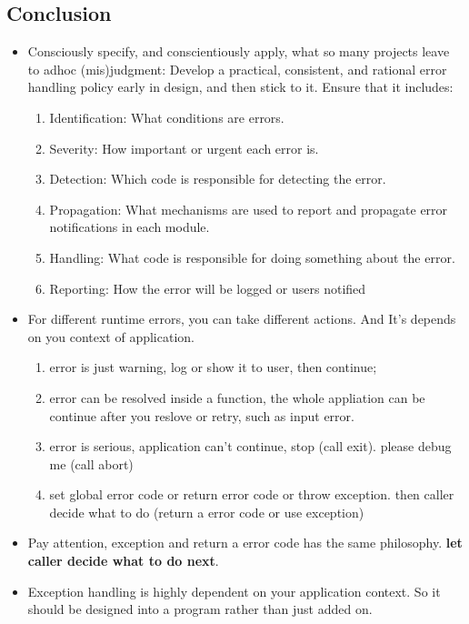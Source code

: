\documentclass[a4paper,12pt,twoside]{book}
\begin{document}
\subsection{Conclusion}
\begin{itemize}


\item  Consciously specify, and conscientiously apply, what so many projects leave to adhoc
(mis)judgment: Develop a practical, consistent, and rational error handling
policy early in design, and then stick to it. Ensure that it includes:

\begin{enumerate}
\item Identification: What conditions are errors.
\item Severity: How important or urgent each error is.
\item Detection: Which code is responsible for detecting the error.
\item Propagation: What mechanisms are used to report and propagate error
notifications in each module.
\item Handling: What code is responsible for doing something about the error.
\item Reporting: How the error will be logged or users notified
\end{enumerate}


\item For different runtime errors, you can take different actions. And It's depends on you context of application.
\begin{enumerate}
\item error is just warning, log or show it to user, then continue;
\item error can be resolved inside a function, the whole appliation can be continue after you reslove or retry, such as input error.
\item error is serious, application can't continue, stop (call exit).  please debug me (call abort)
\item set global error code or return error code or throw exception. then caller decide what to do (return a error code or use exception)
\end{enumerate}

\item Pay attention, exception and return a error code has the same philosophy. \textbf{let caller decide what to do next}.

\item Exception handling is highly dependent on your application context. So it should be designed into a program rather than just added on.


\end{itemize}
\end{document}
